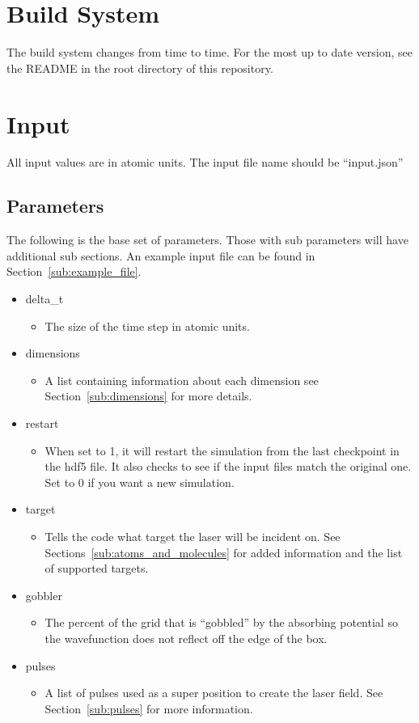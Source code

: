 \documentclass{article}
\begin{document}
\section{Build System} %
\label{sec:build_system}
The build system changes from time to time. For the most up to date version, see the README in the root directory of this repository.

\section{Input} %
\label{sec:input}

All input values are in atomic units. The input file name should be ``input.json''

\subsection{Parameters} %
\label{sub:parameters_input}
The following is the base set of parameters. Those with sub parameters will have additional sub sections. An example input file can be found in Section~\ref{sub:example_file}.
\begin{itemize}
  \item delta\_t
  \begin{itemize}
    \item The size of the time step in atomic units.
  \end{itemize}
  \item dimensions
  \begin{itemize}
    \item A list containing information about each dimension see Section~\ref{sub:dimensions} for more details.
  \end{itemize}
  \item restart
  \begin{itemize}
    \item When set to 1, it will restart the simulation from the last checkpoint in the hdf5 file. It also checks to see if the input files match the original one. Set to 0 if you want a new simulation.
  \end{itemize}
  \item target
  \begin{itemize}
    \item Tells the code what target the laser will be incident on. See Sections~\ref{sub:atoms_and_molecules} for added information and the list of supported targets.
  \end{itemize}
  \item gobbler
  \begin{itemize}
    \item The percent of the grid that is ``gobbled'' by the absorbing potential so the wavefunction does not reflect off the edge of the box.
  \end{itemize}
  \item pulses
  \begin{itemize}
    \item A list of pulses used as a super position to create the laser field. See Section~\ref{sub:pulses} for more information.
  \end{itemize}
\end{itemize}
\end{document}
